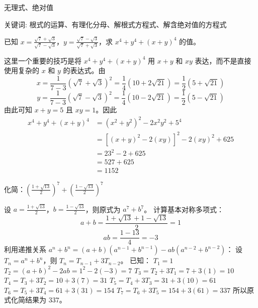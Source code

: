 \begin{center}
  {\fontsize{30pt}{26pt}\selectfont
    \hypertarget{无理式、绝对值}{无理式、绝对值} \label{无理式、绝对值}
  }
\end{center}
\separator
\begin{center}
    关键词: 根式的运算、有理化分母、解根式方程式、解含绝对值的方程式
\end{center}
\vspace{0.5pt}
\begin{questions}

    \question 已知 $x = \frac{\sqrt{7} + \sqrt{3}}{\sqrt{7} - \sqrt{3}}$，$y = \frac{\sqrt{7} - \sqrt{3}}{\sqrt{7} + \sqrt{3}}$，求 $x^4 + y^4 + (x + y)^4$ 的值。

\begin{solution}
这里一个重要的技巧是将 $x^4 + y^4 + (x + y)^4$ 用 $x + y$ 和 $xy$ 表达，而不是直接使用复杂的 $x$ 和 $y$ 的表达式。由
\[
x = \frac{1}{7 - 3}(\sqrt{7} + \sqrt{3})^2 = \frac{1}{4}(10 + 2\sqrt{21}) = \frac{1}{2}(5 + \sqrt{21})
\]
\[
y = \frac{1}{7 - 3}(\sqrt{7} - \sqrt{3})^2 = \frac{1}{4}(10 - 2\sqrt{21}) = \frac{1}{2}(5 - \sqrt{21})
\]
由此可知 $x + y = 5$ 且 $xy = 1$。因此
\begin{align*}
x^4 + y^4 + (x + y)^4 &= (x^2 + y^2)^2 - 2x^2y^2 + 5^4 \\
&= \left[ (x + y)^2 - 2(xy) \right]^2 - 2(xy)^2 + 625 \\
&= 23^2 - 2 + 625 \\
&= 527 + 625 \\
&= 1152
\end{align*}
\end{solution}

\question
化简：$\left( \frac{1 + \sqrt{13}}{2} \right)^7 + \left( \frac{1 - \sqrt{13}}{2} \right)^7$

\begin{solution}
设 $a = \frac{1 + \sqrt{13}}{2}$，$b = \frac{1 - \sqrt{13}}{2}$，则原式为 $a^7 + b^7$。
计算基本对称多项式：
\[
a + b = \frac{1 + \sqrt{13} + 1 - \sqrt{13}}{2} = 1
\]
\[
ab = \frac{1 - 13}{4} = -3
\]
利用递推关系 $a^n + b^n = (a + b)(a^{n-1} + b^{n-1}) - ab(a^{n-2} + b^{n-2})$：
设 $T_n = a^n + b^n$，则 $T_n = T_{n-1} + 3T_{n-2}$。
已知：
$T_1 = 1$
$T_2 = (a+b)^2 - 2ab = 1^2 - 2(-3) = 7$
$T_3 = T_2 + 3T_1 = 7 + 3(1) = 10$
$T_4 = T_3 + 3T_2 = 10 + 3(7) = 31$
$T_5 = T_4 + 3T_3 = 31 + 3(10) = 61$
$T_6 = T_5 + 3T_4 = 61 + 3(31) = 154$
$T_7 = T_6 + 3T_5 = 154 + 3(61) = 337$
所以原式化简结果为 $337$。
\end{solution}


\end{questions}
